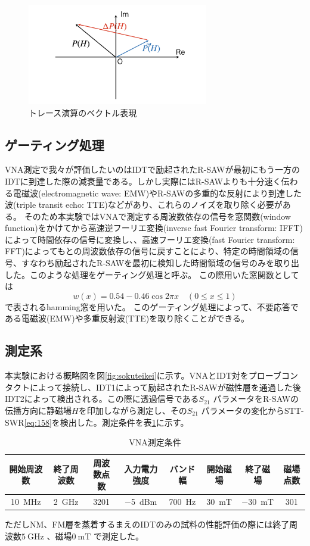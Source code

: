 \documentclass[dvipdfmx,11pt]{jsreport}
\numberwithin{equation}{chapter}
\numberwithin{table}{chapter}
\begin{document}
\begin{figure}[H]
	\centering
	\includegraphics[width=0.7\textwidth]{sefig/sefig.002.jpeg}
	\caption{トレース演算のベクトル表現}
	\label{fig:sefig-sefig-002-jpeg}
\end{figure}
\subsection{ゲーティング処理}
VNA測定で我々が評価したいのはIDTで励起されたR-SAWが最初にもう一方のIDTに到達した際の減衰量である。しかし実際にはR-SAWよりも十分速く伝わる電磁波(electromagnetic wave: EMW)やR-SAWの多重的な反射により到達した波(triple transit echo: TTE)などがあり、これらのノイズを取り除く必要がある。
そのため本実験ではVNAで測定する周波数依存の信号を窓関数(window function)をかけてから高速逆フーリエ変換(inverse fast Fourier transform: IFFT)によって時間依存の信号に変換し、、高速フーリエ変換(fast Fourier transform: FFT)によってもとの周波数依存の信号に戻すことにより、特定の時間領域の信号、すなわち励起されたR-SAWを最初に検知した時間領域の信号のみを取り出した。このような処理をゲーティング処理と呼ぶ。
この際用いた窓関数としては
\begin{equation}
\label{eq:z6}
	w(x)=0.54-0.46 \cos 2\pi x\quad(0\le x\le 1)
\end{equation}
で表されるhamming窓を用いた。
このゲーティング処理によって、不要応答である電磁波(EMW)や多重反射波(TTE)を取り除くことができる。
\subsection{測定系}
本実験における概略図を図\ref{fig:sokuteikei}に示す。VNAとIDT対をプローブコンタクトによって接続し、IDT1によって励起されたR-SAWが磁性層を通過した後IDT2によって検出される。この際に透過信号である$S_{21}$ パラメータをR-SAWの伝播方向に静磁場$H$を印加しながら測定し、その$S_{21}$ パラメータの変化からSTT-SWR\eqref{eq:158}を検出した。測定条件を表\ref{tab:3}に示す。
\begin{table}[H]
	\centering
	\caption{VNA測定条件}
	\label{tab:3}
	\begin{tabular}{ccccc|ccc}\hline \hline
		開始周波数&終了周波数&周波数点数&入力電力強度&バンド幅&開始磁場&終了磁場&磁場点数\\ \hline 
		\SI{10}{\mega \hertz}&\SI{2}{\giga \hertz}&3201&\SI{-5}{dBm}&\SI{700}{\hertz}&\SI{30}{\milli \tesla}&\SI{-30}{\milli \tesla}&301\\\hline\hline
	\end{tabular}
\end{table}
ただしNM、FM層を蒸着するまえのIDTのみの試料の性能評価の際には終了周波数$\SI{5}{\giga \hertz}$ 、磁場$\SI{0}{\milli \tesla}$ で測定した。
\end{document}
